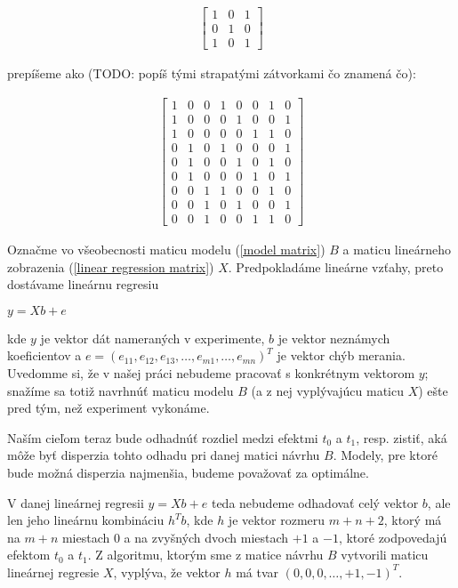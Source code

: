 \begin{align}
\label{model matrix}
\begin{bmatrix}
1 & 0 & 1 \\
0 & 1 & 0 \\
1 & 0 & 1
\end{bmatrix}
\end{align}

prepíšeme ako (TODO: popíš tými strapatými zátvorkami čo znamená čo):

\begin{align}
\label{linear regression matrix}
\begin{bmatrix}
1 & 0 & 0 & 1 & 0 & 0 & 1 & 0 \\
1 & 0 & 0 & 0 & 1 & 0 & 0 & 1 \\
1 & 0 & 0 & 0 & 0 & 1 & 1 & 0 \\
0 & 1 & 0 & 1 & 0 & 0 & 0 & 1 \\
0 & 1 & 0 & 0 & 1 & 0 & 1 & 0 \\
0 & 1 & 0 & 0 & 0 & 1 & 0 & 1 \\
0 & 0 & 1 & 1 & 0 & 0 & 1 & 0 \\
0 & 0 & 1 & 0 & 1 & 0 & 0 & 1 \\
0 & 0 & 1 & 0 & 0 & 1 & 1 & 0
\end{bmatrix}
\end{align}

Označme vo všeobecnosti maticu modelu (\ref{model matrix}) $B$ a maticu lineárneho zobrazenia (\ref{linear regression matrix}) $X$. 
Predpokladáme lineárne vzťahy, preto dostávame lineárnu regresiu

\begin{center}
$
y = X b + e
$
\end{center}

kde $y$ je vektor dát nameraných v experimente, $b$ je vektor neznámych koeficientov a 
$e = (e_{11}, e_{12}, e_{13}, \ldots, e_{m1}, \dots, e_{mn})^T$ je vektor chýb merania. 
Uvedomme si, že v našej práci nebudeme pracovať s konkrétnym vektorom $y$; 
snažíme sa totiž navrhnúť maticu modelu $B$ (a z nej vyplývajúcu maticu $X$) ešte pred tým, než experiment vykonáme.

Naším cieľom teraz bude odhadnúť rozdiel medzi efektmi $t_0$ a $t_1$, resp. zistiť, 
aká môže byť disperzia tohto odhadu pri danej matici návrhu $B$. 
Modely, pre ktoré bude možná disperzia najmenšia, budeme považovať za optimálne.

V danej lineárnej regresii $y = X b + e$ teda nebudeme odhadovať celý vektor $b$, 
ale len jeho lineárnu kombináciu $h^T b$, kde $h$ je vektor rozmeru $m + n + 2$, 
ktorý má na $m + n$ miestach $0$ a na zvyšných dvoch miestach $+1$ a $-1$, ktoré zodpovedajú efektom $t_0$ a $t_1$. 
Z algoritmu, ktorým sme z matice návrhu $B$ vytvorili maticu lineárnej regresie $X$, 
vyplýva, že vektor $h$ má tvar $(0, 0, 0, \ldots, +1, -1)^T$.

